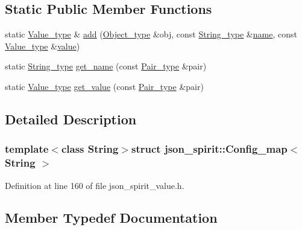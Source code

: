 \subsection*{Static Public Member Functions}
\begin{DoxyCompactItemize}
\item 
static \hyperlink{structjson__spirit_1_1_config__map_a1beec86663fb1ca76e98852b93a90c5c}{Value\+\_\+type} \& \hyperlink{structjson__spirit_1_1_config__map_aef0dfe17dd6bb674f65a7c631189f1d0}{add} (\hyperlink{structjson__spirit_1_1_config__map_a64fd50a8a903e22e3909e83244a0c92f}{Object\+\_\+type} \&obj, const \hyperlink{structjson__spirit_1_1_config__map_abcfbacb1047e017b281210332f574b87}{String\+\_\+type} \&\hyperlink{testharness_8cc_a8f8f80d37794cde9472343e4487ba3eb}{name}, const \hyperlink{structjson__spirit_1_1_config__map_a1beec86663fb1ca76e98852b93a90c5c}{Value\+\_\+type} \&\hyperlink{cache_8cc_a0f61d63b009d0880a89c843bd50d8d76}{value})
\item 
static \hyperlink{structjson__spirit_1_1_config__map_abcfbacb1047e017b281210332f574b87}{String\+\_\+type} \hyperlink{structjson__spirit_1_1_config__map_ab42f4902cc98efa53ce2ecf905963083}{get\+\_\+name} (const \hyperlink{structjson__spirit_1_1_config__map_a2fe4847e01358c060b7a20cfce43305c}{Pair\+\_\+type} \&pair)
\item 
static \hyperlink{structjson__spirit_1_1_config__map_a1beec86663fb1ca76e98852b93a90c5c}{Value\+\_\+type} \hyperlink{structjson__spirit_1_1_config__map_ad54f20d4aa429741fcdc4627eea1c91a}{get\+\_\+value} (const \hyperlink{structjson__spirit_1_1_config__map_a2fe4847e01358c060b7a20cfce43305c}{Pair\+\_\+type} \&pair)
\end{DoxyCompactItemize}


\subsection{Detailed Description}
\subsubsection*{template$<$class String$>$struct json\+\_\+spirit\+::\+Config\+\_\+map$<$ String $>$}



Definition at line 160 of file json\+\_\+spirit\+\_\+value.\+h.



\subsection{Member Typedef Documentation}
\hypertarget{structjson__spirit_1_1_config__map_a2efd6f753201c1c08c30d96e27c192d7}{}
